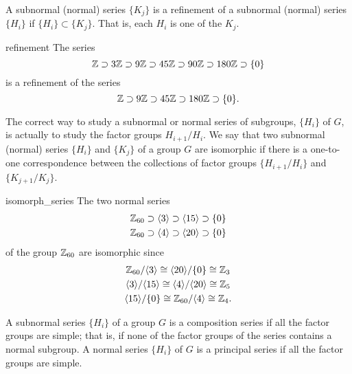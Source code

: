  
A subnormal (normal) series $\{ K_j \}$ is a {\bfi refinement of a
subnormal (normal) series\/} $\{ H_i \}$ if $\{ H_i \} \subset \{ K_j
\}$. That is, each $H_i$ is one of the $K_j$. 
 

\begin{example}{refinement}
The series
\[
{\Bbb Z} \supset 3{\Bbb Z} \supset 9{\Bbb Z} \supset 45{\Bbb Z}
\supset 90{\Bbb Z} \supset 180{\Bbb Z} \supset \{0\}
\]
is a refinement of the series
\[
{\Bbb Z} \supset 9{\Bbb Z} \supset 45{\Bbb Z} \supset 180{\Bbb Z} 
\supset \{0\}.
\]
\end{example}

 
The correct way to study a subnormal or normal series of subgroups,
$\{ H_i \}$ of $G$, is actually to study the factor groups
$H_{i+1}/H_i$.  We say that two subnormal (normal) series $\{H_i \}$
and $\{ K_j \}$ of a group $G$ are {\bfi isomorphic\/} if there is a
one-to-one correspondence between the collections of factor groups
$\{H_{i+1}/H_i \}$ and $\{ K_{j+1}/ K_j \}$. 
 

\begin{example}{isomorph_series}
The two normal series
\begin{gather*}
{\Bbb Z}_{60} \supset \langle 3 \rangle \supset  \langle 15 \rangle
\supset \{ 0 \} \\
{\Bbb Z}_{60} \supset \langle 4 \rangle \supset  \langle 20 \rangle
\supset \{ 0 \}
\end{gather*}
of the group ${\Bbb Z}_{60}$ are isomorphic since
\begin{gather*}
{\Bbb Z}_{60} / \langle 3 \rangle \cong \langle 20 \rangle /
\{ 0 \} \cong {\Bbb Z}_{3}
\\
\langle 3 \rangle / \langle 15 \rangle
\cong \langle 4 \rangle /  \langle 20 \rangle \cong {\Bbb Z}_{5}
\\
\langle 15 \rangle / \{ 0 \} \cong {\Bbb Z}_{60} / \langle 4 \rangle
\cong {\Bbb Z}_4.
\end{gather*}
\end{example}
 

A subnormal series $\{ H_i \}$ of a group $G$ is a {\bfi composition
series\/} if all the factor groups are 
simple; that is, if none of the factor groups of the series contains a
normal subgroup. A normal series $\{ H_i \}$ of $G$ is a {\bfi 
principal series\/} if all the factor groups 
are simple.  
 
 
 
